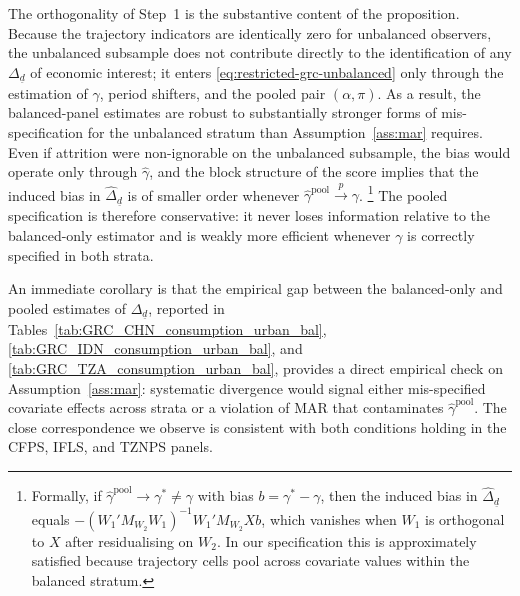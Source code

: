 \begin{remark}
The orthogonality of Step~1 is the substantive content of the
proposition. Because the trajectory indicators are identically zero
for unbalanced observers, the unbalanced subsample does not
contribute directly to the identification of any $\Delta_{\underline
d}$ of economic interest; it enters
\eqref{eq:restricted-grc-unbalanced} only through the estimation of
$\gamma$, period shifters, and the pooled pair $(\alpha,\pi)$. As a
result, the balanced-panel estimates are robust to substantially
stronger forms of mis-specification for the unbalanced stratum than
Assumption~\ref{ass:mar} requires. Even if attrition were
non-ignorable on the unbalanced subsample, the bias would operate
only through $\hat\gamma$, and the block structure of the score
implies that the induced bias in $\hat\Delta_{\underline d}$ is of
smaller order whenever
$\hat\gamma^{\mathrm{pool}}\overset{p}{\to}\gamma$.%
\footnote{Formally, if $\hat\gamma^{\mathrm{pool}}\to\gamma^\ast\ne\gamma$
  with bias $b=\gamma^\ast-\gamma$, then the induced bias in
  $\hat\Delta_{\underline d}$ equals $-(W_1'M_{W_2}W_1)^{-1}W_1'M_{W_2}Xb$,
  which vanishes when $W_1$ is orthogonal to $X$ after residualising
  on $W_2$. In our specification this is approximately satisfied
  because trajectory cells pool across covariate values within the
  balanced stratum.}
The pooled specification is therefore conservative: it never loses
information relative to the balanced-only estimator and is weakly
more efficient whenever $\gamma$ is correctly specified in both
strata.
\end{remark}

\begin{remark}
An immediate corollary is that the empirical gap between the balanced-only
and pooled estimates of $\Delta_{\underline d}$, reported in
Tables~\ref{tab:GRC_CHN_consumption_urban_bal},
\ref{tab:GRC_IDN_consumption_urban_bal}, and
\ref{tab:GRC_TZA_consumption_urban_bal}, provides a direct empirical
check on Assumption~\ref{ass:mar}: systematic divergence would signal
either mis-specified covariate effects across strata or a violation of
MAR that contaminates $\hat\gamma^{\mathrm{pool}}$. The close
correspondence we observe is consistent with both conditions holding
in the CFPS, IFLS, and TZNPS panels.
\end{remark}

